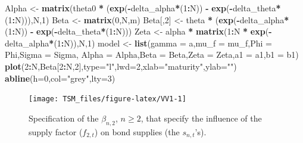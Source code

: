 \documentclass[
  12pt,
]{book}
\newenvironment{Shaded}{\begin{snugshade}}{\end{snugshade}}
\newcommand{\AttributeTok}[1]{\textcolor[rgb]{0.13,0.29,0.53}{#1}}
\newcommand{\DecValTok}[1]{\textcolor[rgb]{0.00,0.00,0.81}{#1}}
\newcommand{\FunctionTok}[1]{\textcolor[rgb]{0.13,0.29,0.53}{\textbf{#1}}}
\newcommand{\NormalTok}[1]{#1}
\newcommand{\OtherTok}[1]{\textcolor[rgb]{0.56,0.35,0.01}{#1}}
\newcommand{\SpecialCharTok}[1]{\textcolor[rgb]{0.81,0.36,0.00}{\textbf{#1}}}
\newcommand{\StringTok}[1]{\textcolor[rgb]{0.31,0.60,0.02}{#1}}
\theoremstyle{definition}
\theoremstyle{definition}
\theoremstyle{definition}
\theoremstyle{definition}
\theoremstyle{remark}
\begin{document}
\begin{Shaded}
\begin{Highlighting}[]
\NormalTok{Alpha      }\OtherTok{\textless{}{-}} \FunctionTok{matrix}\NormalTok{(theta0 }\SpecialCharTok{*}\NormalTok{ (}\FunctionTok{exp}\NormalTok{(}\SpecialCharTok{{-}}\NormalTok{delta\_alpha}\SpecialCharTok{*}\NormalTok{(}\DecValTok{1}\SpecialCharTok{:}\NormalTok{N)) }\SpecialCharTok{{-}}
                                 \FunctionTok{exp}\NormalTok{(}\SpecialCharTok{{-}}\NormalTok{delta\_theta}\SpecialCharTok{*}\NormalTok{(}\DecValTok{1}\SpecialCharTok{:}\NormalTok{N))),N,}\DecValTok{1}\NormalTok{)}
\NormalTok{Beta      }\OtherTok{\textless{}{-}} \FunctionTok{matrix}\NormalTok{(}\DecValTok{0}\NormalTok{,N,m)}
\NormalTok{Beta[,}\DecValTok{2}\NormalTok{]  }\OtherTok{\textless{}{-}}\NormalTok{ theta }\SpecialCharTok{*}\NormalTok{ (}\FunctionTok{exp}\NormalTok{(}\SpecialCharTok{{-}}\NormalTok{delta\_alpha}\SpecialCharTok{*}\NormalTok{(}\DecValTok{1}\SpecialCharTok{:}\NormalTok{N)) }\SpecialCharTok{{-}}
                        \FunctionTok{exp}\NormalTok{(}\SpecialCharTok{{-}}\NormalTok{delta\_theta}\SpecialCharTok{*}\NormalTok{(}\DecValTok{1}\SpecialCharTok{:}\NormalTok{N)))}
\NormalTok{Zeta      }\OtherTok{\textless{}{-}}\NormalTok{ alpha }\SpecialCharTok{*} \FunctionTok{matrix}\NormalTok{(}\DecValTok{1}\SpecialCharTok{:}\NormalTok{N }\SpecialCharTok{*} \FunctionTok{exp}\NormalTok{(}\SpecialCharTok{{-}}\NormalTok{delta\_alpha}\SpecialCharTok{*}\NormalTok{(}\DecValTok{1}\SpecialCharTok{:}\NormalTok{N)),N,}\DecValTok{1}\NormalTok{)}
\NormalTok{model }\OtherTok{\textless{}{-}} \FunctionTok{list}\NormalTok{(}\AttributeTok{gamma =}\NormalTok{ a,}\AttributeTok{mu\_f =}\NormalTok{ mu\_f,}\AttributeTok{Phi =}\NormalTok{ Phi,}\AttributeTok{Sigma =}\NormalTok{ Sigma,}
              \AttributeTok{Alpha =}\NormalTok{ Alpha,}\AttributeTok{Beta =}\NormalTok{ Beta,}\AttributeTok{Zeta =}\NormalTok{ Zeta,}\AttributeTok{a1 =}\NormalTok{ a1,}\AttributeTok{b1 =}\NormalTok{ b1)}
\FunctionTok{plot}\NormalTok{(}\DecValTok{2}\SpecialCharTok{:}\NormalTok{N,Beta[}\DecValTok{2}\SpecialCharTok{:}\NormalTok{N,}\DecValTok{2}\NormalTok{],}\AttributeTok{type=}\StringTok{"l"}\NormalTok{,}\AttributeTok{lwd=}\DecValTok{2}\NormalTok{,}\AttributeTok{xlab=}\StringTok{"maturity"}\NormalTok{,}\AttributeTok{ylab=}\StringTok{""}\NormalTok{)}
\FunctionTok{abline}\NormalTok{(}\AttributeTok{h=}\DecValTok{0}\NormalTok{,}\AttributeTok{col=}\StringTok{"grey"}\NormalTok{,}\AttributeTok{lty=}\DecValTok{3}\NormalTok{)}
\end{Highlighting}
\end{Shaded}

\begin{figure}
\texttt{[image: TSM\_files/figure-latex/VV1-1]} \caption{Specification of the $\beta_{n,2}$, $n\ge 2$, that specify the influence of the supply factor ($f_{2,t}$) on bond supplies (the $s_{n,t}$'s).}\label{fig:VV1}
\end{figure}
\end{document}
